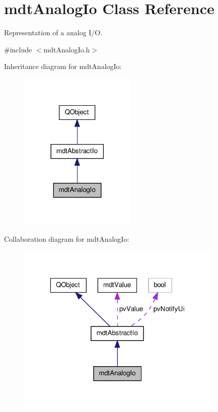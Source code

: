 \hypertarget{classmdt_analog_io}{\section{mdt\-Analog\-Io Class Reference}
\label{classmdt_analog_io}
}


Representation of a analog I/\-O.  




{\ttfamily \#include $<$mdt\-Analog\-Io.\-h$>$}



Inheritance diagram for mdt\-Analog\-Io\-:
\nopagebreak
\begin{figure}[H]
\begin{center}
\leavevmode
\includegraphics[width=158pt]{classmdt_analog_io__inherit__graph}
\end{center}
\end{figure}


Collaboration diagram for mdt\-Analog\-Io\-:
\nopagebreak
\begin{figure}[H]
\begin{center}
\leavevmode
\includegraphics[width=280pt]{classmdt_analog_io__coll__graph}
\end{center}
\end{figure}
